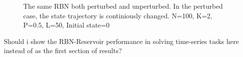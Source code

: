 \begin{figure}
  \centering


  \caption{The same RBN both perturbed and unperturbed. In the perturbed case, the state trajectory is continiously changed. N=100, K=2, P=0.5, L=50, Initial state=0}
\end{figure}

Should i show the RBN-Reservoir performance in solving time-series tasks here instead of as the first section of results?
